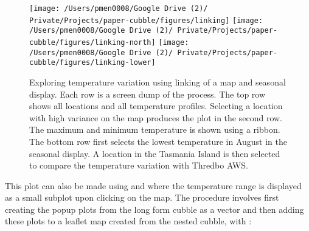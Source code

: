 \documentclass{article}
\newenvironment{Shaded}{\begin{snugshade}}{\end{snugshade}}
\newcommand{\AttributeTok}[1]{\textcolor[rgb]{0.77,0.63,0.00}{#1}}
\newcommand{\CommentTok}[1]{\textcolor[rgb]{0.56,0.35,0.01}{\textit{#1}}}
\newcommand{\ControlFlowTok}[1]{\textcolor[rgb]{0.13,0.29,0.53}{\textbf{#1}}}
\newcommand{\DecValTok}[1]{\textcolor[rgb]{0.00,0.00,0.81}{#1}}
\newcommand{\ErrorTok}[1]{\textcolor[rgb]{0.64,0.00,0.00}{\textbf{#1}}}
\newcommand{\FunctionTok}[1]{\textcolor[rgb]{0.00,0.00,0.00}{#1}}
\newcommand{\NormalTok}[1]{#1}
\newcommand{\OtherTok}[1]{\textcolor[rgb]{0.56,0.35,0.01}{#1}}
\newcommand{\SpecialCharTok}[1]{\textcolor[rgb]{0.00,0.00,0.00}{#1}}
\newcommand{\StringTok}[1]{\textcolor[rgb]{0.31,0.60,0.02}{#1}}
\begin{document}
\begin{figure}
\texttt{[image: /Users/pmen0008/Google Drive (2)/ Private/Projects/paper-cubble/figures/linking]} \texttt{[image: /Users/pmen0008/Google Drive (2)/ Private/Projects/paper-cubble/figures/linking-north]} \texttt{[image: /Users/pmen0008/Google Drive (2)/ Private/Projects/paper-cubble/figures/linking-lower]} \caption{Exploring temperature variation using linking of a map and seasonal display. Each row is a screen dump of the process. The top row shows all locations and all temperature profiles. Selecting a location with high variance on the map produces the plot in the second row. The maximum and minimum temperature is shown using a ribbon. The bottom row first selects the lowest temperature in August in the seasonal display. A location in the Tasmania Island is then selected to compare the temperature variation with Thredbo AWS.}\label{fig:interactive-linking}
\end{figure}

This plot can also be made using  and  where the temperature range is displayed as a small subplot upon clicking on the map. The procedure involves first creating the popup plots from the long form cubble as a vector and then adding these plots to a leaflet map created from the nested cubble, with :

\begin{Shaded}
\end{Shaded}
\end{document}
